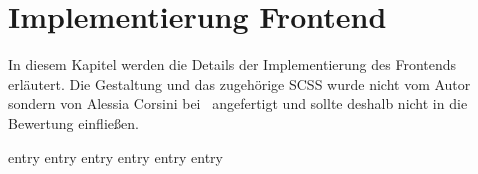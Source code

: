 \chapter{Implementierung Frontend}
\label{chap:implementierung_frontend}

In diesem Kapitel werden die Details der Implementierung des Frontends
erläutert.  Die Gestaltung und das zugehörige SCSS wurde nicht vom Autor
sondern von Alessia Corsini bei \mesods~angefertigt und sollte deshalb nicht in
die Bewertung einfließen.

{entry}
{entry}
{entry}
{entry}
{entry}
{entry}
